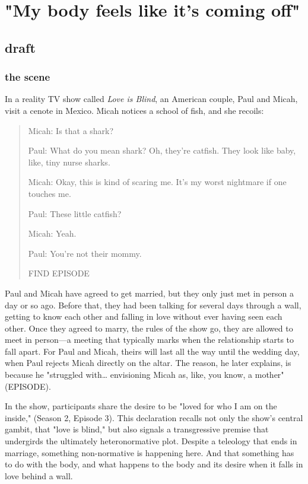 \documentclass[11pt]{article}
\author{fcalado}
\date{\today}
\title{}
\begin{document}
\tableofcontents

\section{"My body feels like it’s coming off"}
\label{sec:org8c947a3}
\subsection{draft}
\label{sec:org8e46186}
\subsubsection{the scene}
\label{sec:orge1b4d93}
In a reality TV show called \emph{Love is Blind}, an American couple, Paul
and Micah, visit a cenote in Mexico. Micah notices a school of fish,
and she recoils:
\begin{quote}
Micah: Is that a shark?

Paul: What do you mean shark? Oh, they're catfish. They look like
baby, like, tiny nurse sharks.

Micah: Okay, this is kind of scaring me. It's my worst nightmare if
one touches me.

Paul: These little catfish?

Micah: Yeah.

Paul: You're not their mommy.

FIND EPISODE
\end{quote}
Paul and Micah have agreed to get married, but they only just met in
person a day or so ago. Before that, they had been talking for several
days through a wall, getting to know each other and falling in love
without ever having seen each other. Once they agreed to marry, the
rules of the show go, they are allowed to meet in person---a meeting
that typically marks when the relationship starts to fall apart. For
Paul and Micah, theirs will last all the way until the wedding day,
when Paul rejects Micah directly on the altar. The reason, he later
explains, is because he "struggled with\ldots{} envisioning Micah as, like,
you know, a mother" (EPISODE).

In the show, participants share the desire to be "loved for who I am
on the inside," (Season 2, Episode 3). This declaration recalls not
only the show's central gambit, that "love is blind," but also signals
a transgressive premise that undergirds the ultimately heteronormative
plot. Despite a teleology that ends in marriage, something
non-normative is happening here. And that something has to do with the
body, and what happens to the body and its desire when it falls in
love behind a wall.
\end{document}
